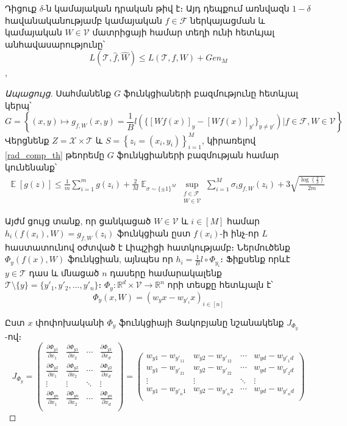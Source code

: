 \documentclass[12pt]{article}
\DeclareMathOperator*{\E}{\mathbb{E}}
\begin{document}
\begin{lemma}
\label{rad_lemma_main}
Դիցուք $\delta$-ն կամայական դրական թիվ է։ Այդ դեպքում առնվազն $1-\delta$ հավանականությամբ կամայական $f \in \mathcal{F}$ ներկայացման և կամայական $W \in \mathcal{V}$ մատրիցայի համար տեղի ունի հետևյալ անհավասարությունը՝
$$L(\mathcal{T}, \hat{f}, \hat{W}) \leq L(\mathcal{T}, f, W) + Gen_M$$,
\end{lemma}
\begin{proof}[Ապացույց]
 Սահմանենք $G$ ֆունկցիաների բազմությունը հետևյալ կերպ՝
$$G = \left \{ (x, y) \mapsto  g_{f, W}(x, y) = \frac{1}{B}l(\{[Wf(x)]_y - [Wf(x)]_{y'}\}_{y\neq y'}   ) | f \in \mathcal{F}, W \in \mathcal{V} \right \}$$
Վերցնենք $Z = \mathcal{X} \times \mathcal{T}$ և $S = \left \{z_i = (x_i, y_i) \right \}_{i=1}^M$, կիրառելով \ref{rad_comp_th} թեորեմը $G$ ֆունկցիաների բազմության համար կունենանք՝
\begin{align}
\label{rad_ineq_1}
\E[g(z)] \leq \frac{1}{m}\sum_{i=1}^mg(z_i) + \frac{2}{M}\E_{\sigma \sim \{\pm1\}^M} \sup_{\substack{ f  \in \mathcal{F}  \\ W \in \mathcal{V}}}\sum_{i=1}^M \sigma_ig_{f,W}(z_i) +    3\sqrt{\frac{\log \left( \frac{2}{\delta} \right)}{2m}}
\end{align}

Այժմ ցույց տանք, որ ցանկացած $W \in \mathcal{V}$  և $i \in [M]$ համար $h_i(f(x_i), W) = g_{f,W}(z_i)$ ֆունկցիան ըստ $f(x_i)$-ի ինչ-որ $L$ հաստատունով օժտված է Լիպշիցի հատկությամբ։ Ներմուծենք $\Phi_y(f(x), W)$ ֆունկցիան, այնպես որ $h_i = \frac{1}{B} l \circ \Phi_{y_i}$։ Ֆիքսենք որևէ $y \in \mathcal{T}$ դաս և մնացած $n$ դասերը համարակալենք  $\mathcal{T} \setminus \{y\} =\{y'_1, y'_2, ..., y'_n\} $։ $\Phi_y : \mathbb{R}^d \times \mathcal{V} \rightarrow \mathbb{R}^n$ որի տեսքը հետևյալն է՝
$$\Phi_y(x, W) = (w_yx-w_{y'_{i}}x)_{i \in [n]}$$

Ըստ $x$ փոփոխականի $\Phi_y$  ֆունկցիայի Յակոբյանը նշանակենք $J_{\Phi_y} $-ով։
$$J_{\Phi_y}  = 
 \begin{pmatrix}
 \frac{\partial \Phi_{y1}}{\partial x_1} & \frac{\partial \Phi_{y1}}{\partial x_2} & \cdots & \frac{\partial \Phi_{y1}}{\partial x_d} \\
  \frac{\partial \Phi_{y2}}{\partial x_1} & \frac{\partial \Phi_{y2}}{\partial x_2} & \cdots & \frac{\partial \Phi_{y2}}{\partial x_d} \\
  \vdots  & \vdots  & \ddots & \vdots  \\
  \frac{\partial \Phi_{yn}}{\partial x_1} & \frac{\partial \Phi_{yn}}{\partial x_2} & \cdots & \frac{\partial \Phi_{yn}}{\partial x_d} \\
 \end{pmatrix} =
 \begin{pmatrix}
 w_{y1} - w_{{y'}_11} & w_{y2} - w_{{y'}_12} & \cdots & w_{yd} - w_{{y'}_1d} \\
   w_{y1} - w_{{y'}_21} & w_{y2} - w_{{y'}_22} & \cdots & w_{yd} - w_{{y'}_2d} \\
  \vdots  & \vdots  & \ddots & \vdots  \\
  w_{y1} - w_{{y'}_n1} & w_{y2} - w_{{y'}_n2} & \cdots & w_{yd} - w_{{y'}_nd} \\
 \end{pmatrix}
 $$


\end{proof}
\end{document}
